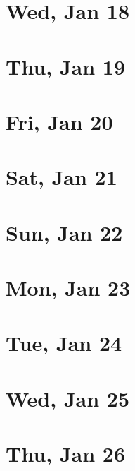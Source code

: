 	\section{Wed, Jan 18}
		
		
	\section{Thu, Jan 19}
		
		
	\section{Fri, Jan 20}
		
		
	\section{Sat, Jan 21}
		
		
	\section{Sun, Jan 22}
		
		
	\section{Mon, Jan 23}
		
		
	\section{Tue, Jan 24}
		
		
	\section{Wed, Jan 25}
		
		
	\section{Thu, Jan 26}
		
		
